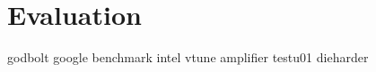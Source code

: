 \documentclass{stdlocal}
\begin{document}
  \section{Evaluation} %
  \label{sec:evaluation}
    godbolt
    google benchmark
    intel vtune amplifier
    testu01
    dieharder
\end{document}
